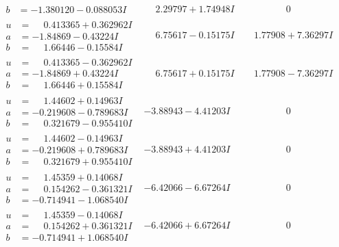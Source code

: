\documentclass[1p]{elsarticle_modified}
\theoremstyle{definition}
\begin{document}
$$\begin{array}{c|c|c}
\begin{aligned}
b &= -1.380120 - 0.088053 I\end{aligned}
 & \phantom{-}2.29797 + 1.74948 I & \phantom{-0.000000 } 0 \\ \hline\begin{aligned}
u &= \phantom{-}0.413365 + 0.362962 I \\
a &= -1.84869 - 0.43224 I \\
b &= \phantom{-}1.66446 - 0.15584 I\end{aligned}
 & \phantom{-}6.75617 - 0.15175 I & \phantom{-}1.77908 + 7.36297 I \\ \hline\begin{aligned}
u &= \phantom{-}0.413365 - 0.362962 I \\
a &= -1.84869 + 0.43224 I \\
b &= \phantom{-}1.66446 + 0.15584 I\end{aligned}
 & \phantom{-}6.75617 + 0.15175 I & \phantom{-}1.77908 - 7.36297 I \\ \hline\begin{aligned}
u &= \phantom{-}1.44602 + 0.14963 I \\
a &= -0.219608 - 0.789683 I \\
b &= \phantom{-}0.321679 - 0.955410 I\end{aligned}
 & -3.88943 - 4.41203 I & \phantom{-0.000000 } 0 \\ \hline\begin{aligned}
u &= \phantom{-}1.44602 - 0.14963 I \\
a &= -0.219608 + 0.789683 I \\
b &= \phantom{-}0.321679 + 0.955410 I\end{aligned}
 & -3.88943 + 4.41203 I & \phantom{-0.000000 } 0 \\ \hline\begin{aligned}
u &= \phantom{-}1.45359 + 0.14068 I \\
a &= \phantom{-}0.154262 - 0.361321 I \\
b &= -0.714941 - 1.068540 I\end{aligned}
 & -6.42066 - 6.67264 I & \phantom{-0.000000 } 0 \\ \hline\begin{aligned}
u &= \phantom{-}1.45359 - 0.14068 I \\
a &= \phantom{-}0.154262 + 0.361321 I \\
b &= -0.714941 + 1.068540 I\end{aligned}
 & -6.42066 + 6.67264 I & \phantom{-0.000000 } 0 \\ \hline\begin{aligned}

\end{aligned}
\end{array}$$
\end{document}
